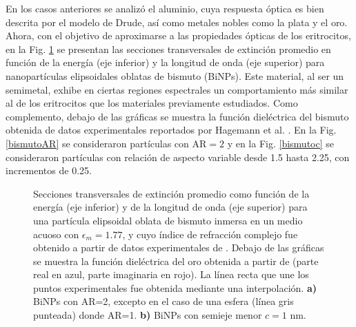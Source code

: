 En los casos anteriores se analizó el aluminio, cuya respuesta óptica es bien descrita por el modelo de Drude, así como metales nobles como la plata y el oro. Ahora, con el objetivo de aproximarse a las propiedades ópticas de los eritrocitos, en la Fig. \ref{bismuto} se presentan las secciones transversales de extinción promedio en función de la energía (eje inferior) y la longitud de onda (eje superior) para nanopartículas elipsoidales oblatas de bismuto (BiNPs). Este material, al ser un semimetal, exhibe en ciertas regiones espectrales un comportamiento más similar al de los eritrocitos que los materiales previamente estudiados. Como complemento, debajo de las gráficas se muestra la función dieléctrica del bismuto obtenida de datos experimentales reportados por Hagemann et al. \cite{Bismuto}. En la Fig. \ref{bismutoAR} se consideraron partículas con  AR$=2$  y en la Fig. \ref{bismutoc} se consideraron partículas con relación de aspecto variable desde 1.5 hasta 2.25, con incrementos de 0.25. 

\begin{figure}[H]
	\quad%
	\caption{Secciones transversales de extinción promedio  como función de la energía (eje inferior) y de la longitud de onda (eje superior) para una partícula elipsoidal oblata de bismuto inmersa en un medio acuoso con $\epsilon_m=1.77$, y cuyo índice de refracción complejo fue obtenido a partir de datos experimentales de \cite{Bismuto}. Debajo de las gráficas se muestra la función dieléctrica del oro obtenida a partir de \cite{Plata} (parte real en azul, parte imaginaria en rojo). La línea recta que une los puntos experimentales fue obtenida mediante una interpolación. \textbf{a)} BiNPs con AR=2, excepto en el caso de una esfera (línea gris punteada) donde AR=1. \textbf{b)} BiNPs con semieje menor $c=1$ nm.}\label{bismuto}
\end{figure}

